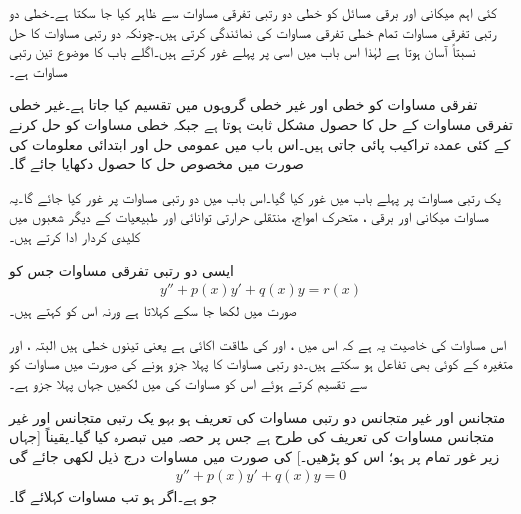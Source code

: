 کئی اہم میکانی اور برقی مسائل کو خطی دو رتبی تفرقی مساوات سے ظاہر کیا جا سکتا ہے۔خطی دو رتبی تفرقی مساوات  تمام خطی تفرقی مساوات کی نمائندگی کرتی ہیں۔چونکہ دو رتبی مساوات کا حل نسبتاً آسان ہوتا ہے لہٰذا اس باب میں اسی پر پہلے غور کرتے ہیں۔اگلے باب کا موضوع تین رتبی مساوات ہے۔

تفرقی مساوات کو خطی اور غیر خطی گروہوں میں تقسیم کیا جاتا ہے۔غیر خطی تفرقی مساوات کے حل کا حصول مشکل ثابت ہوتا ہے جبکہ خطی مساوات کو حل کرنے کے کئی عمدہ تراکیب پائی جاتی ہیں۔اس باب میں عمومی حل اور ابتدائی معلومات کی صورت میں مخصوص حل کا حصول دکھایا جائے گا۔

یک رتبی مساوات پر پہلے باب میں غور کیا گیا۔اس باب میں دو رتبی مساوات پر غور کیا جائے گا۔یہ مساوات میکانی اور برقی ، متحرک امواج، منتقلی حرارتی توانائی اور طبیعیات کے دیگر شعبوں میں کلیدی کردار ادا کرتے ہیں۔

ایسی دو رتبی تفرقی مساوات جس کو
\begin{align}\label{مساوات_سادہ_دو_درجی_تعریف}
y''+p(x)y'+q(x)y=r(x)
\end{align}
صورت میں لکھا جا سکے  کہلاتا ہے ورنہ اس کو  کہتے ہیں۔

اس مساوات کی خاصیت یہ ہے کہ اس میں ،  اور  کی طاقت اکائی ہے  یعنی تینوں خطی ہیں البتہ ،  اور  متغیرہ  کے کوئی بھی تفاعل ہو سکتے ہیں۔دو رتبی مساوات کا پہلا جزو  ہونے کی صورت میں مساوات کو  سے تقسیم کرتے ہوئے اس کو مساوات  کی  میں لکھیں جہاں   پہلا  جزو ہے۔

متجانس اور غیر متجانس دو رتبی مساوات کی تعریف ہو بہو یک رتبی متجانس اور غیر متجانس مساوات کی تعریف کی طرح ہے جس پر حصہ  میں تبصرہ کیا گیا۔یقیناً  [جہاں زیر غور تمام  پر   ہو؛ اس کو  پڑھیں۔] کی صورت میں مساوات  درج ذیل لکھی جائے گی 
\begin{align}\label{مساوات_سادہ_متجانس_دو_درجی_تعریف}
y''+p(x)y'+q(x)y=0
\end{align}
جو  ہے۔اگر  ہو تب مساوات   کہلائے گا۔

